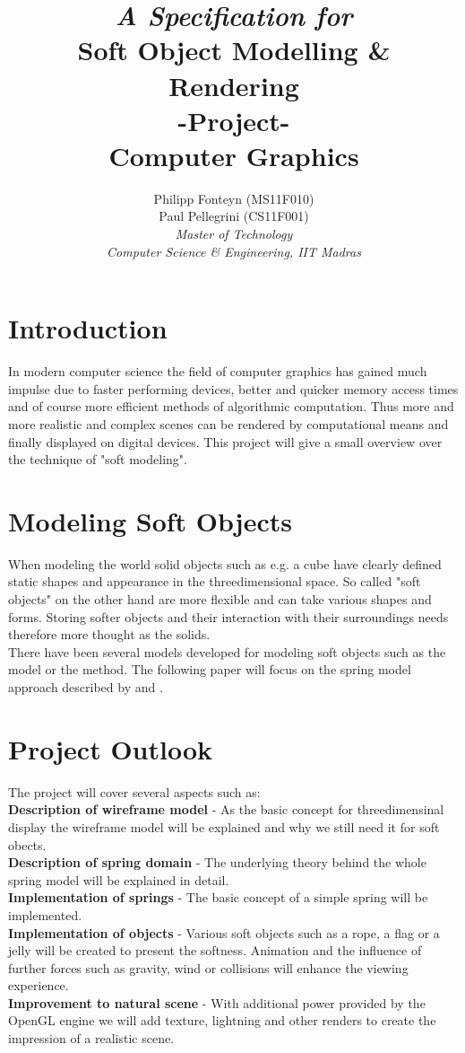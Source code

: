 \documentclass[11pt]{article}
\title{
	\emph{A Specification for}\\
	\huge{\textbf{Soft Object Modelling \& Rendering} }\\
	-Project-\\
	Computer Graphics\\[2em]	
}
\author{
	Philipp Fonteyn (MS11F010)\\
	Paul Pellegrini (CS11F001)\\[2em]
	\emph{Master of Technology}\\
	\emph{Computer Science \& Engineering, IIT Madras}
}
\begin{document}
\maketitle
\newpage

%
%
%
\section{Introduction}
In modern computer science the field of computer graphics has gained much impulse due to faster performing devices, better and quicker memory access times and of course more efficient methods of algorithmic computation. Thus more and more realistic and complex scenes can be rendered by computational means and finally displayed on digital devices. This project will give a small overview over the technique of "soft modeling".
%
%
%
\section{Modeling Soft Objects}
When modeling the world solid objects such as e.g. a cube have clearly defined static shapes and appearance in the threedimensional space. So called "soft objects" on the other hand are more flexible and can take various shapes and forms. Storing softer objects and their interaction with their surroundings needs therefore more thought as the solids.\\[1em]
%
There have been several models developed for modeling soft objects such as the \cite{} model or the \cite{} method. The following paper will focus on the spring model approach described by \cite{} and \cite{}.

%
%
%
\section{Project Outlook}
The project will cover several aspects such as:\\[1em]
%
\textbf{Description of wireframe model} - As the basic concept for threedimensinal display the wireframe model will be explained and why we still need it for soft obects.\\[1em]
%
\textbf{Description of spring domain} - The underlying theory behind the whole spring model will be explained in detail.\\[1em]
%
\textbf{Implementation of springs} - The basic concept of a simple spring will be implemented.\\[1em]
%
\textbf{Implementation of objects} - Various soft objects such as a rope, a flag or a jelly will be created to present the softness. Animation and the influence of further forces such as gravity, wind or collisions will enhance the viewing experience.\\[1em]
%
\textbf{Improvement to natural scene} - With additional power provided by the OpenGL engine we will add texture, lightning and other renders to create the impression of a realistic scene.
%
\end{document}
